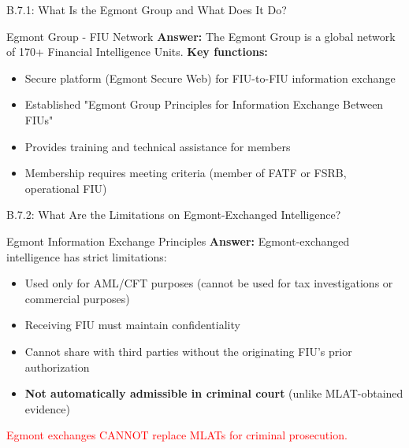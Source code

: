\documentclass{beamer}
\begin{document}
	\begin{frame}{B.7.1: What Is the Egmont Group and What Does It Do?}
		\begin{block}{Egmont Group - FIU Network}
			\textbf{Answer:} The Egmont Group is a global network of 170+ Financial Intelligence Units.
			\vspace{0.2cm}
			\textbf{Key functions:}
			\begin{itemize}
				\item Secure platform (Egmont Secure Web) for FIU-to-FIU information exchange
				\item Established "Egmont Group Principles for Information Exchange Between FIUs"
				\item Provides training and technical assistance for members
				\item Membership requires meeting criteria (member of FATF or FSRB, operational FIU)
			\end{itemize}
		\end{block}
	\end{frame}
	
	\begin{frame}{B.7.2: What Are the Limitations on Egmont-Exchanged Intelligence?}
		\begin{block}{Egmont Information Exchange Principles}
			\textbf{Answer:} Egmont-exchanged intelligence has strict limitations:
			\vspace{0.2cm}
			\begin{itemize}
				\item Used only for AML/CFT purposes (cannot be used for tax investigations or commercial purposes)
				\item Receiving FIU must maintain confidentiality
				\item Cannot share with third parties without the originating FIU's prior authorization
				\item \textbf{Not automatically admissible in criminal court} (unlike MLAT-obtained evidence)
			\end{itemize}
			\textcolor{red}{Egmont exchanges CANNOT replace MLATs for criminal prosecution.}
		\end{block}
	\end{frame}
	
	
\end{document}
